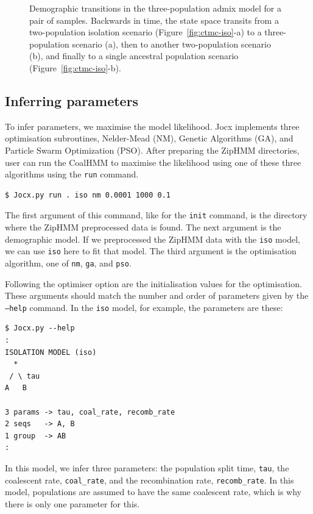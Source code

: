 \documentclass[graybox]{svmult}
\begin{document}
\begin{figure}[h]
\caption{Demographic transitions in the three-population admix model for a pair of samples.  Backwards in time, the state space transits from a two-population isolation scenario (Figure~\ref{fig:ctmc-iso}-a) to a three-population scenario (a), then to another two-population scenario (b), and finally to a single ancestral population scenario (Figure~\ref{fig:ctmc-iso}-b).}
\label{fig:ctmc-admix23}
\end{figure}

\subsection{Inferring parameters}

To infer parameters, we maximise the model likelihood. Jocx implements three optimisation subroutines, Nelder-Mead (NM), Genetic Algorithms (GA), and Particle Swarm Optimization (PSO). After preparing the ZipHMM directories, user can run the CoalHMM to maximise the likelihood using one of these three algorithms using the \texttt{run} command.

 {\scriptsize{}\begin{verbatim}
$ Jocx.py run . iso nm 0.0001 1000 0.1
\end{verbatim}}

The first argument of this command, like for the \texttt{init} command, is the directory where the ZipHMM preprocessed data is found. The next argument is the demographic model. If we preprocessed the ZipHMM data with the \texttt{iso} model, we can use \texttt{iso} here to fit that model. The third argument is the optimisation algorithm, one of \texttt{nm}, \texttt{ga}, and \texttt{pso}.

Following the optimiser option are the initialisation values for the optimisation. These arguments should match the number and order of parameters given by the \texttt{--help} command. In the \texttt{iso} model, for example, the parameters are these:

 {\scriptsize{}\begin{verbatim}
$ Jocx.py --help
:
ISOLATION MODEL (iso)
  *
 / \ tau
A   B

3 params -> tau, coal_rate, recomb_rate
2 seqs   -> A, B
1 group  -> AB
:
\end{verbatim}}

In this model, we infer three parameters: the population split time, \texttt{tau}, the coalescent rate, \texttt{coal\_rate}, and the recombination rate, \texttt{recomb\_rate}. In this model, populations are assumed to have the same coalescent rate, which is why there is only one parameter for this.
\end{document}
